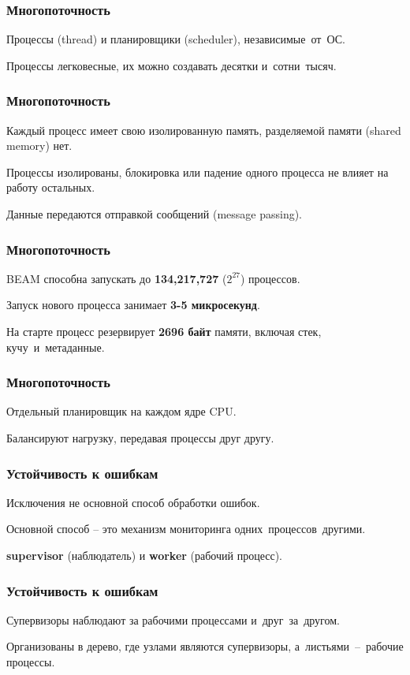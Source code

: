 \documentclass[10pt]{beamer}
\begin{document}
\begin{frame}
  \frametitle{Многопоточность}
  Процессы (thread) и планировщики (scheduler), независимые~от~ОС.
  \par \bigskip
  Процессы легковесные, их можно создавать десятки и~сотни~тысяч.
  \par \bigskip
\end{frame}
  
\begin{frame}
  \frametitle{Многопоточность}
  Каждый процесс имеет свою изолированную память, разделяемой памяти (shared memory) нет.
  \par \bigskip
  Процессы изолированы, блокировка или падение одного процесса не влияет на работу остальных.
  \par \bigskip
  Данные передаются отправкой сообщений (message passing).
\end{frame}

\begin{frame}
  \frametitle{Многопоточность}
  BEAM способна запускать до \textbf{134,217,727} ($2^{27}$) процессов.
  \par \bigskip
  Запуск нового процесса занимает \textbf{3-5 микросекунд}.
  \par \bigskip
  На старте процесс резервирует \textbf{2696 байт} памяти, включая стек, кучу~и~метаданные.
\end{frame}


\begin{frame}
  \frametitle{Многопоточность}
  Отдельный планировщик на каждом ядре CPU.
  \par \bigskip
  Балансируют нагрузку, передавая процессы друг другу.
\end{frame}

\begin{frame}
  \frametitle{Устойчивость к ошибкам}
  Исключения не основной способ обработки ошибок.
  \par \bigskip
  Основной способ -- это механизм мониторинга одних~процессов~другими.
  \par \bigskip
  \textbf{supervisor} (наблюдатель) и \textbf{worker} (рабочий процесс).
\end{frame}

\begin{frame}
  \frametitle{Устойчивость к ошибкам}
  Супервизоры наблюдают за рабочими процессами и~друг~за~другом.
  \par \bigskip
  Организованы в дерево, где узлами являются супервизоры, а~листьями~–~рабочие процессы.
\end{frame}
\end{document}
